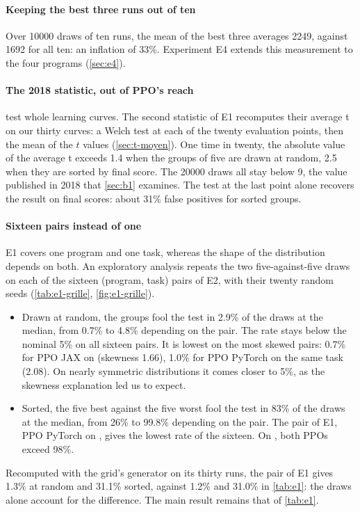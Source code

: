 \paragraph{Keeping the best three runs out of ten}
Over \num{10000} draws of ten runs, the mean of the best three averages \num{2249}, against \num{1692} for all
ten: an inflation of 33\%. Experiment E4 extends this measurement to the four programs (\cref{sec:e4}).

\paragraph{The 2018 statistic, out of PPO's reach}
\textcite{henderson2018matters} test whole learning curves. The second statistic of E1
recomputes their average t on our thirty curves: a Welch test at each of the
twenty evaluation points, then the mean of the $t$ values (\cref{sec:t-moyen}). One time in twenty, the
absolute value of the average t exceeds 1.4 when the groups of five are drawn at random, 2.5 when they are
sorted by final score. The \num{20000} draws all stay below 9, the value published in 2018 that \cref{sec:b1} examines. The test at the last point alone recovers the
result on final scores: about 31\% false positives for sorted groups.

\paragraph{Sixteen pairs instead of one}
E1 covers one program and one task, whereas the shape of the distribution depends on both. An exploratory
analysis repeats the two five-against-five draws on each
of the sixteen (program, task) pairs of E2, with their twenty random seeds (\cref{tab:e1-grille},
\cref{fig:e1-grille}).
\begin{itemize}
  \item Drawn at random, the groups fool the test in 2.9\% of the draws at the median, from 0.7\% to 4.8\%
    depending on the pair. The rate stays below the nominal 5\% on all sixteen pairs. It is lowest on the
    most skewed pairs: 0.7\% for PPO JAX on  (skewness 1.66), 1.0\% for PPO PyTorch on the
    same task (2.08). On nearly symmetric distributions it comes closer to 5\%, as the skewness explanation led
    us to expect.
  \item Sorted, the five best against the five worst fool the test in 83\% of the draws at the median, from
    26\% to 99.8\% depending on the pair. The pair of E1, PPO PyTorch on , gives the
    lowest rate of the sixteen. On , both PPOs exceed 98\%.
\end{itemize}
Recomputed with the grid's generator on its thirty runs, the pair of E1 gives 1.3\% at random and
31.1\% sorted, against 1.2\% and 31.0\% in \cref{tab:e1}: the draws alone account for the difference. The
main result remains that of \cref{tab:e1}.

